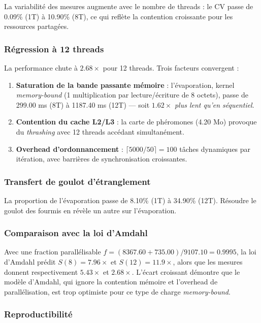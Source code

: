 \documentclass[11pt,a4paper]{article}
\begin{document}
La variabilité des mesures augmente avec le nombre de threads : le CV passe de 0.09\% (1T) à 10.90\% (8T), ce qui reflète la contention croissante pour les ressources partagées.

\subsubsection{Régression à 12 threads}

La performance chute à $2.68\times$ pour 12 threads. Trois facteurs convergent :

\begin{enumerate}[nosep]
    \item \textbf{Saturation de la bande passante mémoire} : l'évaporation, kernel \emph{memory-bound} (1 multiplication par lecture/écriture de 8 octets), passe de 299.00 ms (8T) à 1187.40 ms (12T) --- soit $1.62\times$ \emph{plus lent qu'en séquentiel}.
    \item \textbf{Contention du cache L2/L3} : la carte de phéromones (4.20 Mo) provoque du \emph{thrashing} avec 12 threads accédant simultanément.
    \item \textbf{Overhead d'ordonnancement} : $\lceil 5000/50 \rceil = 100$ tâches dynamiques par itération, avec barrières de synchronisation croissantes.
\end{enumerate}

\subsubsection{Transfert de goulot d'étranglement}

La proportion de l'évaporation passe de 8.10\% (1T) à 34.90\% (12T). Résoudre le goulot des fourmis en révèle un autre sur l'évaporation.

\subsubsection{Comparaison avec la loi d'Amdahl}

Avec une fraction parallélisable $f = (8367.60 + 735.00) / 9107.10 = 0.9995$, la loi d'Amdahl prédit $S(8) = 7.96\times$ et $S(12) = 11.9\times$, alors que les mesures donnent respectivement $5.43\times$ et $2.68\times$. L'écart croissant démontre que le modèle d'Amdahl, qui ignore la contention mémoire et l'overhead de parallélisation, est trop optimiste pour ce type de charge \emph{memory-bound}.

\subsubsection{Reproductibilité}
\end{document}
